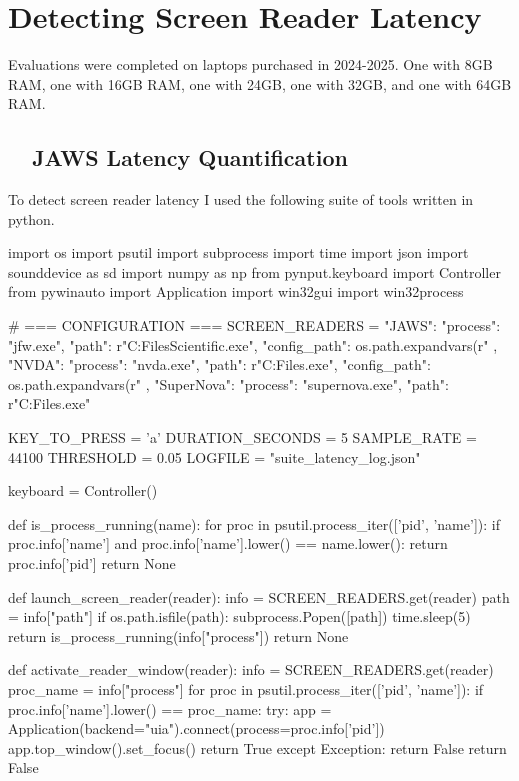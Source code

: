\chapter{Detecting Screen Reader Latency}\label{chap:computationappendix}

Evaluations were completed on laptops purchased in 2024-2025. One with 8GB RAM, one with 16GB RAM, one with 24GB, one with 32GB, and one with 64GB RAM.

\section{~~JAWS Latency Quantification}
To detect screen reader latency I used the following suite of tools written in python.

\begin{pyverbatim}
	import os
	import psutil
	import subprocess
	import time
	import json
	import sounddevice as sd
	import numpy as np
	from pynput.keyboard import Controller
	from pywinauto import Application
	import win32gui
	import win32process

	# === CONFIGURATION ===
	SCREEN_READERS = {
	"JAWS": {
	"process": "jfw.exe",
	"path": r"C:\Program Files\Freedom Scientific\JAWS{}\jfw.exe",
	"config_path": os.path.expandvars(r"%
	},
	"NVDA": {
	"process": "nvda.exe",
	"path": r"C:\Program Files\NVDA\nvda.exe",
	"config_path": os.path.expandvars(r"%
	},
	"SuperNova": {
	"process": "supernova.exe",
	"path": r"C:\Program Files\Dolphin\SuperNova\supernova.exe"
	}
	}

	KEY_TO_PRESS = 'a'
	DURATION_SECONDS = 5
	SAMPLE_RATE = 44100
	THRESHOLD = 0.05
	LOGFILE = "suite_latency_log.json"

	keyboard = Controller()

	def is_process_running(name):
	for proc in psutil.process_iter(['pid', 'name']):
	if proc.info['name'] and proc.info['name'].lower() == name.lower():
	return proc.info['pid']
	return None

	def launch_screen_reader(reader):
	info = SCREEN_READERS.get(reader)
	path = info["path"]
	if os.path.isfile(path):
	subprocess.Popen([path])
	time.sleep(5)
	return is_process_running(info["process"])
	return None

	def activate_reader_window(reader):
	info = SCREEN_READERS.get(reader)
	proc_name = info["process"]
	for proc in psutil.process_iter(['pid', 'name']):
	if proc.info['name'].lower() == proc_name:
	try:
	app = Application(backend="uia").connect(process=proc.info['pid'])
	app.top_window().set_focus()
	return True
	except Exception:
	return False
	return False


\end{pyverbatim}
